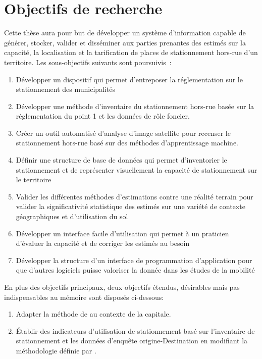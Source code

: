 \section{Objectifs de recherche}  \label{sec:obj_recherche}%
Cette thèse aura pour but de développer un système d'information capable de générer, stocker, valider et disséminer aux parties prenantes des estimés sur la capacité, la localisation et la tarification de places de stationnement hors-rue d'un territoire. Les sous-objectifs suivants sont poursuivis :

\begin{enumerate}
\item Développer un dispositif qui permet d'entreposer la réglementation sur le stationnement des municipalités 
\item Développer une méthode d'inventaire du stationnement hors-rue basée sur la réglementation du point 1 et les données de rôle foncier.
\item Créer un outil automatisé d'analyse d'image satellite pour recenser le stationnement hors-rue basé sur des méthodes d'apprentissage machine.
\item Définir une structure de base de données qui permet d'inventorier le stationnement et de représenter visuellement la capacité de stationnement sur le territoire
\item Valider les différentes méthodes d'estimations contre une réalité terrain pour valider la significativité statistique des estimés sur une variété de contexte géographiques et d'utilisation du sol
\item Développer un interface facile d'utilisation qui permet à un praticien d'évaluer la capacité et de corriger les estimés au besoin
\item Développer la structure d'un interface de programmation d'application pour que d'autres logiciels puisse valoriser la donnée dans les études de la mobilité
\end{enumerate}
En plus des objectifs principaux, deux objectifs étendus, désirables mais pas indispensables au mémoire sont disposés ci-dessous:
\begin{enumerate}
\item Adapter la méthode de \textcite{Bourdeau:MethodologieAnalyse:2014} au contexte de la capitale.
\item Établir des indicateurs d'utilisation de stationnement basé sur l'inventaire de stationnement et les données d'enquête origine-Destination en modifiant la méthodologie définie par \textcite{Diallo:MethodologyParking:2015}.
\end{enumerate}
